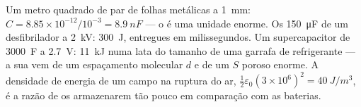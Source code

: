 \begin{example}\label{ex:b1:potential-capacitors:energies}
Um metro quadrado de par de folhas metálicas a \qty{1}{mm}: $C = 8.85 \times 10^{-12}/
10^{-3} = \qty{8.9}{nF}$ --- o  é uma unidade enorme. Os
\qty{150}{\micro F} de um desfibrilador a \qty{2}{kV}: \qty{300}{J}, entregues em milissegundos.
Um supercapacitor de \qty{3000}{F} a \qty{2.7}{V}: \qty{11}{kJ} numa lata
do tamanho de uma garrafa de refrigerante --- a sua  vem de um
espaçamento molecular $d$ e de um $S$ poroso enorme. A densidade de energia de um campo na
ruptura do ar, $\tfrac12\varepsilon_0(3 \times 10^6)^2 = \qty{40}{J/m^3}$, é
a razão de os  armazenarem tão pouco em comparação com as baterias.
\end{example}

